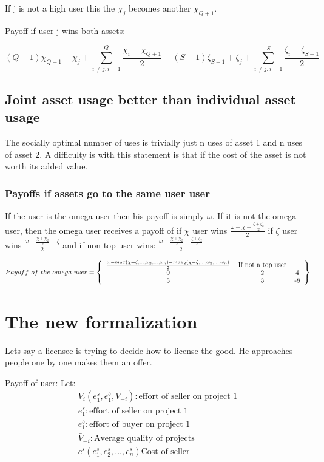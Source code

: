 \documentclass{article}
\begin{document}
If j is not a high user this the $\chi_j$ becomes another $\chi_{Q+1}$. 

Payoff if user j wins both assets: 

\begin{equation}
(Q-1)\chi_{Q+1}+\chi_j+\sum^Q_{i\neq j,i=1}\frac{\chi_i-\chi_{Q+1}}{2}+(S-1)\zeta_{S+1}+\zeta_j+\sum^S_{i\neq j,i=1}\frac{\zeta_i-\zeta_{S+1}}{2}
\end{equation}

\subsection{Joint asset usage better than individual asset usage}

The socially optimal number of uses is trivially just n uses of asset 1 and n uses of asset 2. A difficulty is with this statement is that if the cost of the asset is not worth its added value.  

\subsubsection{Payoffs if assets go to the same user user}

If the user is the omega user then his payoff is simply $\omega$. If it is not the omega user, then the omega user receives a payoff of if $\chi$ user wins $\frac{\omega-\chi-\frac{\zeta+\zeta_2}{2}}{2}$ if $\zeta$ user wins $\frac{\omega-\frac{\chi+\chi_2}{2}-\zeta}{2}$ and if non top user wins: $\frac{\omega-\frac{\chi+\chi_2}{2}-\frac{\zeta+\zeta_2}{2}}{2}$

\[ 
Payoff~of~the~omega~user=
\left \{
  \begin{tabular}{ccc}
  $\frac{\omega -max(\chi+\zeta,...,\omega_2,...,\omega_n)-max_2( \chi + \zeta,...,\omega_2,...,\omega_n)}{2}$ & If not a top user \\
  0 & 2 & 4 \\
  3 & 3 & -8 
  \end{tabular}
\right \}
\]


\section{The new formalization}
Lets say a licensee is trying to decide how to license the good. He approaches people one by one makes them an offer. 

Payoff of user:
Let:
\begin{align*}
V_i(e_1^s,e_1^b,\bar{V}_{-i}): \text{effort of seller on project 1} \\
e_1^s: \text{effort of seller on project 1} \\
e_1^b: \text{effort of buyer on project 1} \\
\bar{V}_{-i}: \text{Average quality of projects} \\
c^s(e^s_1,e^s_2,...,e^s_n) \text{Cost of seller}
\end{align*}
\end{document}
